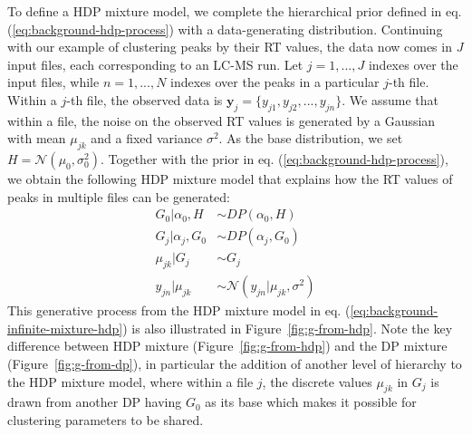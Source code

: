 To define a HDP mixture model, we complete the hierarchical prior defined in eq. (\ref{eq:background-hdp-process}) with a data-generating distribution. Continuing with our example of clustering peaks by their RT values, the data now comes in $J$ input files, each corresponding to an LC-MS run. Let $j=1,...,J$ indexes over the input files, while $n=1,...,N$ indexes over the peaks in a particular $j$-th file. Within a $j$-th file, the observed data is $\boldsymbol{y}_j=\{y_{j1}, y_{j2}, ..., y_{jn}\}$. We assume that within a file, the noise on the observed RT values is generated by a Gaussian with mean $\mu_{jk}$ and a fixed variance $\sigma^2$. As the base distribution, we set $H=\mathcal{N}(\mu_0, \sigma_0^2)$. Together with the prior in eq. (\ref{eq:background-hdp-process}), we obtain the following HDP mixture model that explains how the RT values of peaks in multiple files can be generated:
\begin{equation}
\begin{aligned}
G_0 \vert \alpha_0, H &\sim DP(\alpha_0, H) \\
G_j \vert \alpha_j, G_0 &\sim DP(\alpha_j, G_0) \\
\mu_{jk} \vert G_j               &\sim G_j \\
y_{jn} \vert \mu_{jk}           &\sim \mathcal{N}(y_{jn} \vert \mu_{jk}, \sigma^2)
\end{aligned}
\label{eq:background-infinite-mixture-hdp}
\end{equation}
This generative process from the HDP mixture model in eq. (\ref{eq:background-infinite-mixture-hdp}) is also illustrated in Figure~\ref{fig:g-from-hdp}. Note the key difference between HDP mixture (Figure~\ref{fig:g-from-hdp}) and the DP mixture (Figure~\ref{fig:g-from-dp}), in particular the addition of another level of hierarchy to the HDP mixture model, where within a file $j$, the discrete values $\mu_{jk}$ in $G_{j}$ is drawn from another DP having $G_{0}$ as its base which makes it possible for clustering parameters to be shared. 

